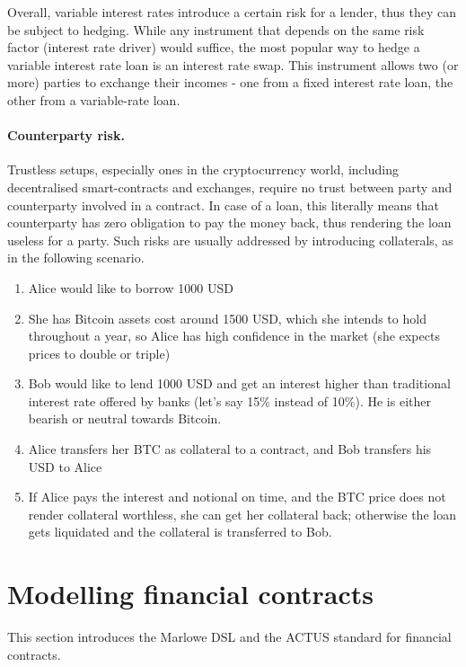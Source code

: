 \documentclass[runningheads]{llncs}
\begin{document}
Overall, variable interest rates introduce a certain risk for a lender,
thus they can be %
subject to hedging. While any instrument that depends
on the same risk factor (interest rate driver) would suffice, the
most popular way to hedge a variable interest rate loan is an interest
rate swap. This instrument allows two (or more) parties to exchange
their incomes - one from a fixed interest rate loan, the other from a variable-rate loan.

\paragraph*{Counterparty risk.}

Trustless setups, especially ones in the cryptocurrency world, including 
decentralised smart-contracts and exchanges, require no trust between
party and counterparty involved in a contract. In case of a loan,
this literally means that counterparty has zero obligation to pay
the money back, thus rendering the loan useless for a party. Such
risks are usually addressed by introducing collaterals, as in the following scenario. 
\begin{enumerate}
\item Alice would like to borrow 1000 USD 
\item She has Bitcoin assets cost around 1500 USD, which she intends to
hold throughout a year, so Alice has high confidence in the market
(she expects prices to double or triple) 
\item Bob would like to lend 1000 USD and get an interest higher than traditional
interest rate offered by banks (let's say 15\% instead of 10\%). He
is either bearish or neutral towards Bitcoin. 
\item Alice transfers her BTC as collateral to a contract, and Bob transfers
his USD to Alice 
\item If Alice pays the interest and notional on time, and the BTC price does not
render collateral worthless, she can get her collateral back; otherwise
the loan gets liquidated and the collateral is transferred to Bob. 
\end{enumerate}

\section{Modelling financial contracts}
\label{modelling}

This section introduces the Marlowe DSL and the ACTUS standard for financial contracts.
\end{document}
